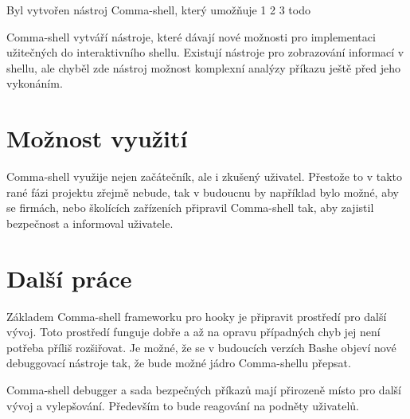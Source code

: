 \documentclass[thesis=M,czech]{FITthesis}[2012/06/26]
\begin{document}



%
%
\begin{conclusion}

Byl vytvořen nástroj Comma-shell, který umožňuje 1 2 3 todo

Comma-shell vytváří nástroje, které dávají nové možnosti pro implementaci užitečných do interaktivního shellu. Existují nástroje pro zobrazování informací v shellu, ale chyběl zde nástroj možnost komplexní analýzy příkazu ještě před jeho vykonáním.


\section{Možnost využití}

Comma-shell využije nejen začátečník, ale i zkušený uživatel. Přestože to v takto rané fázi projektu zřejmě nebude, tak v budoucnu by například bylo možné, aby se firmách, nebo školících zařízeních připravil Comma-shell tak, aby zajistil bezpečnost a informoval uživatele.


\section{Další práce}

Základem Comma-shell frameworku pro hooky je připravit prostředí pro další vývoj. Toto prostředí funguje dobře a až na opravu případných chyb jej není potřeba příliš rozšiřovat. Je možné, že se v budoucích verzích Bashe objeví nové debuggovací nástroje tak, že bude možné jádro Comma-shellu přepsat.

Comma-shell debugger a sada bezpečných příkazů mají přirozeně místo pro další vývoj a vylepšování. Především to bude reagování na podněty uživatelů.

	
\end{conclusion}
\end{document}
